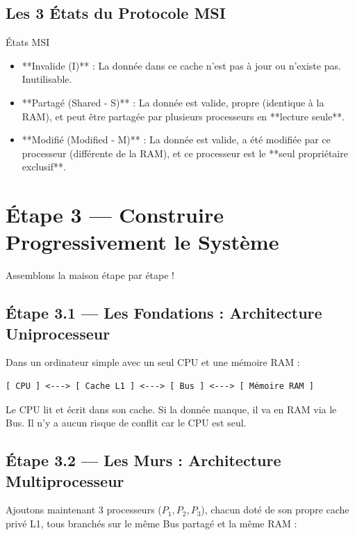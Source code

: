 \documentclass[12pt,a4paper]{article}
\begin{document}
\subsection{Les 3 États du Protocole MSI}
\begin{definitionbox}{États MSI}
\begin{itemize}
    \item **Invalide (I)** : La donnée dans ce cache n'est pas à jour ou n'existe pas. Inutilisable.
    \item **Partagé (Shared - S)** : La donnée est valide, propre (identique à la RAM), et peut être partagée par plusieurs processeurs en **lecture seule**.
    \item **Modifié (Modified - M)** : La donnée est valide, a été modifiée par ce processeur (différente de la RAM), et ce processeur est le **seul propriétaire exclusif**.
\end{itemize}
\end{definitionbox}

\newpage
\section{Étape 3 — Construire Progressivement le Système}

Assemblons la maison étape par étape !

\subsection{Étape 3.1 — Les Fondations : Architecture Uniprocesseur}
Dans un ordinateur simple avec un seul CPU et une mémoire RAM :
\begin{verbatim}
[ CPU ] <---> [ Cache L1 ] <---> [ Bus ] <---> [ Mémoire RAM ]
\end{verbatim}
Le CPU lit et écrit dans son cache. Si la donnée manque, il va en RAM via le Bus. Il n'y a aucun risque de conflit car le CPU est seul.

\subsection{Étape 3.2 — Les Murs : Architecture Multiprocesseur}
Ajoutons maintenant 3 processeurs ($P_1, P_2, P_3$), chacun doté de son propre cache privé L1, tous branchés sur le même Bus partagé et la même RAM :
\end{document}
